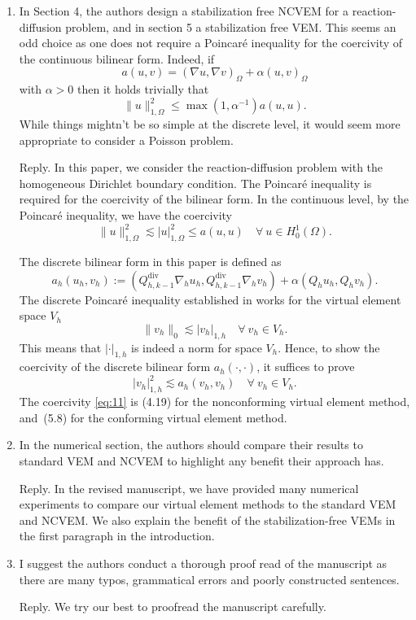 \documentclass[10pt]{amsart}
\theoremstyle{definition}
\theoremstyle{remark}
\renewcommand{\div}{\operatorname{div}}
\begin{document}
\begin{enumerate}[1.]
\medskip

\item \textsf{In Section 4, the authors design a stabilization free NCVEM for a reaction-diffusion problem, and in section 5 a stabilization free VEM. This seems an odd choice as one does not require a Poincar\'e inequality for the coercivity of the continuous bilinear form. Indeed, if
$$
a(u, v)=(\nabla u, \nabla v)_{\Omega}+\alpha (u, v)_{\Omega}
$$
with $\alpha > 0$ then it holds trivially that
$$
\|u\|_{1,\Omega}^2\leq\max(1,\alpha^{-1})a(u,u).
$$
While things mightn't be so simple at the discrete level, it would seem more
appropriate to consider a Poisson problem.}

\smallskip \noindent \textcolor[rgb]{1.00,0.00,0.00}{Reply.} 
In this paper, we consider the reaction-diffusion problem with the homogeneous Dirichlet boundary condition. The Poincar\'e inequality is required for the coercivity of the bilinear form. In the continuous level, by the Poincar\'e inequality, we have the coercivity
\[
\|u\|_{1,\Omega}^2\lesssim |u|_{1,\Omega}^2\leq a(u,u)\quad \forall~u\in H_0^1(\Omega).
\]

The discrete bilinear form in this paper is defined as 
\[
a_h(u_h, v_h):=(Q_{h,k-1}^{\div}\nabla_h u_h, Q_{h,k-1}^{\div}\nabla_h v_h)+\alpha(Q_hu_h, Q_hv_h).
\]
The discrete Poincar\'e inequality established in \cite{Brenner2003} works for the virtual element space $V_h$
\[
\|v_h\|_0\lesssim |v_h|_{1,h}\quad\forall~v_h\in V_h.
\]
This means that $|\cdot|_{1,h}$ is indeed a norm for space $V_h$. Hence, to show the coercivity of the discrete bilinear form $a_h(\cdot, \cdot)$, it suffices to prove
\begin{equation}\label{eq:11}    
|v_h|_{1,h}^2\lesssim a_h(v_h, v_h)\quad\forall~v_h\in V_h.
\end{equation}
The coercivity \eqref{eq:11} is (4.19) for the nonconforming virtual element method, and~(5.8) for the conforming virtual element method.


\medskip

\item \textsf{In the numerical section, the authors should compare their results to standard VEM and NCVEM to highlight any benefit their approach has.}

\smallskip \noindent \textcolor[rgb]{1.00,0.00,0.00}{Reply.}
In the revised manuscript, we have provided many numerical experiments to compare our virtual element methods to the standard VEM and NCVEM. We also explain the benefit of the stabilization-free VEMs in the first paragraph in the introduction.

\medskip

\item \textsf{I suggest the authors conduct a thorough proof read of the manuscript as there are many typos, grammatical errors and poorly constructed sentences.}

\smallskip \noindent \textcolor[rgb]{1.00,0.00,0.00}{Reply.}
We try our best to proofread the manuscript carefully.




\end{enumerate}
\end{document}
